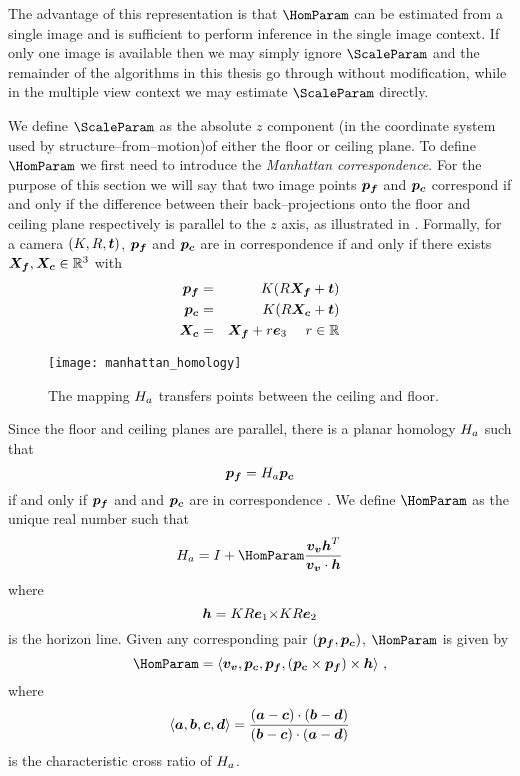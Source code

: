 The advantage of this representation is that $\HomParam$ can be
estimated from a single image and is sufficient to perform inference
in the single image context. If only one image is available then we
may simply ignore $\ScaleParam$ and the remainder of the algorithms in
this thesis go through without modification, while in the multiple
view context we may estimate $\ScaleParam$ directly.

We define $\ScaleParam$ as the absolute $z$ component (in the
coordinate system used by structure--from--motion)\changedsinceviva of
either the floor or ceiling plane. To define $\HomParam$ we first need
to introduce the \textit{Manhattan correspondence}. For the purpose of
this section we will say that two image points $\FloorPt$ and
$\CeilPt$ correspond if and only if the difference between their
back--projections onto the floor and ceiling plane respectively is
parallel to the $z$ axis, as illustrated in
. Formally, for a camera $(\CamMatrix,\CamR,\CamTr)$,
$\FloorPt$ and $\CeilPt$ are in correspondence if and only if there
exists $\FloorVec,\CeilVec \in \Rthree$ with
\begin{eqnarray}
  \FloorPt &=& \CamMatrix (\CamR \FloorVec + \CamTr) \\
  \CeilPt &=& \CamMatrix (\CamR \CeilVec + \CamTr) \\
  \CeilVec &=& \FloorVec + r \ez ~~~~ r \in \Reals
\end{eqnarray}

\begin{figure}[tb]
  \centering
  \texttt{[image: manhattan\_homology]}
  \caption{The mapping $\Hcf$ transfers points between the ceiling
    and floor.}
  \label{fig:homology}
\end{figure}

Since the floor and ceiling planes are parallel, there is a planar
homology $\Hcf$ such that
\begin{equation}
  \FloorPt = \Hcf \CeilPt
\end{equation}
if and only if $\pfloor$ and and $\pceil$ are in correspondence
\cite{Criminisi01}. We define $\HomParam$ as the unique real number
such that
\begin{equation}
  \label{eq:manhattanhom}
  \Hcf = I + \HomParam\frac{\vvpt\horizon^T}{\vvpt \cdot \horizon}
\end{equation}
where
\begin{equation}
  \horizon = \CamMatrix\CamR\ex \cross \CamMatrix\CamR\ey
\end{equation}
is the horizon line. Given any corresponding pair
$(\FloorPt,\CeilPt)$, $\HomParam$ is given by \cite{Criminisi01}
\begin{equation}
  \HomParam = 
  \langle\vvpt,\CeilPt,\FloorPt,(\CeilPt\times\FloorPt)\times\horizon\rangle ~,
\end{equation}
where
\begin{equation}
  \langle \vect{a},\vect{b},\vect{c},\vect{d} \rangle = \frac{
    (\vect{a}-\vect{c}) \cdot (\vect{b}-\vect{d})
  }{
    (\vect{b}-\vect{c}) \cdot (\vect{a}-\vect{d})
  }
\end{equation}
is the characteristic cross ratio of $\Hcf$.

